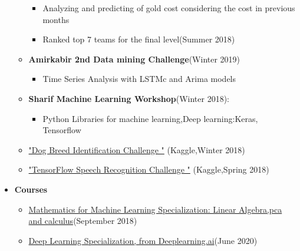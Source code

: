 \documentclass[letterpaper,MMMyyyy,nonstopmode]{simpleresumecv}
\begin{document}
\begin{Body}
\begin{itemize}
\begin{itemize}
\begin{itemize}
     \item Analyzing and predicting of gold cost considering the cost in previous months
     \item Ranked top 7 teams for the final level(Summer 2018)
    
   
    \end{itemize}



\item \textbf {Amirkabir 2nd Data mining Challenge}(Winter 2019)
    	
   \begin{itemize}
	   
     \item Time Series Analysis with LSTMc and Arima models
  
   \end{itemize}


\item     \textbf{ Sharif Machine Learning Workshop}(Winter 2018):
	      \begin{itemize}
	          \item Python Libraries for machine learning,Deep learning:Keras, Tensorflow
	      
	      
	      \end{itemize}

         	\item 
      \href{ https://www.kaggle.com/c/dog-breed-identification}{"Dog Breed Identification Challenge "} (Kaggle,Winter 2018)
      

 
        	\item 
      \href{https://www.kaggle.com/c/tensorflow-speech-recognition-challenge}{"TensorFlow Speech Recognition Challenge "} (Kaggle,Spring 2018)
 
   \end{itemize}     
       \end{itemize}  
        
 \begin{itemize}
    \item \textbf{Courses}
    \begin{itemize}
    
     \item \href {https://coursera.org/share/ef186768574d9675b6eeedfc9afab371}{Mathematics for Machine Learning Specialization: Linear Algebra,pca and calculus}(September 2018)
           
    \item \href {https://coursera.org/share/1bde1eaf453c5df48f61d5d53ce4ee0c}{Deep Learning Specialization, from Deeplearning.ai}(June 2020)
           


\end{itemize}
\end{itemize}
\end{Body}
\end{document}
